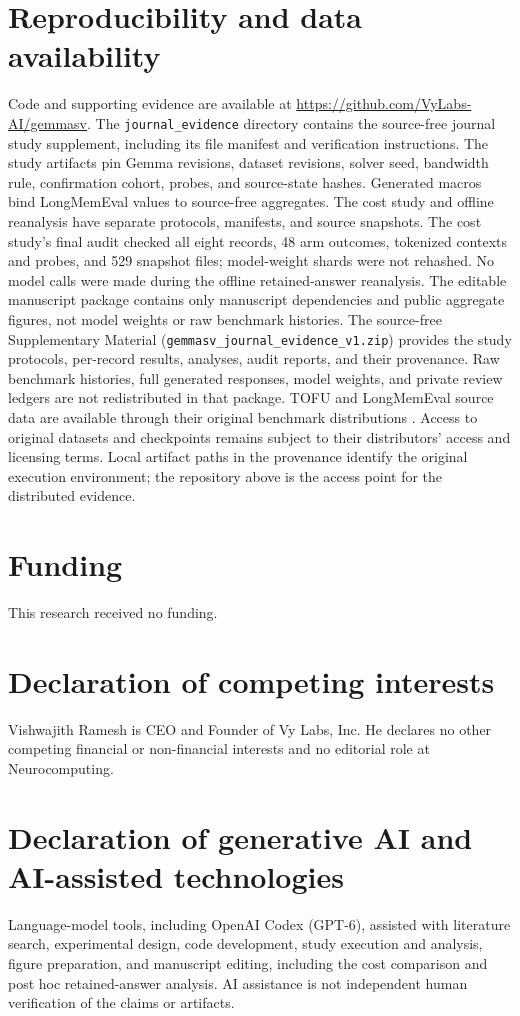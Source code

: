 \section*{Reproducibility and data availability}
Code and supporting evidence are available at
\url{https://github.com/VyLabs-AI/gemmasv}.
The \texttt{journal\_evidence} directory contains the source-free journal
study supplement, including its file manifest and verification instructions.
The study artifacts pin Gemma revisions, dataset revisions, solver seed,
bandwidth rule, confirmation cohort, probes, and source-state hashes.
Generated macros bind LongMemEval values to source-free aggregates.
The cost study and offline reanalysis have separate protocols, manifests,
and source snapshots. The cost study's final audit checked all eight records,
48 arm outcomes, tokenized contexts and probes, and 529 snapshot files;
model-weight shards were not rehashed. No model calls were made during the
offline retained-answer reanalysis. The editable manuscript package contains
only manuscript dependencies and public aggregate figures, not model weights
or raw benchmark histories. The source-free Supplementary Material
(\texttt{gemmasv\_journal\_evidence\_v1.zip}) provides the study protocols,
per-record results, analyses, audit reports, and their provenance. Raw
benchmark histories, full generated responses, model weights, and private
review ledgers are not redistributed in that package. TOFU and LongMemEval
source data are available through their original benchmark distributions
\citep{tofu,longmemeval}. Access to original datasets and checkpoints remains
subject to their distributors' access and licensing terms. Local artifact paths in the provenance identify the original execution environment;
the repository above is the access point for the distributed evidence.

\section*{Funding}
This research received no funding.

\section*{Declaration of competing interests}
Vishwajith Ramesh is CEO and Founder of Vy Labs, Inc. He declares no other
competing financial or non-financial interests and no editorial role at
Neurocomputing.

\section*{Declaration of generative AI and AI-assisted technologies}

Language-model tools, including OpenAI Codex (GPT-6), assisted with literature
search, experimental design, code development, study execution and analysis,
figure preparation, and manuscript editing, including the cost comparison and
post hoc retained-answer analysis. AI assistance is not independent
human verification of the claims or artifacts.
